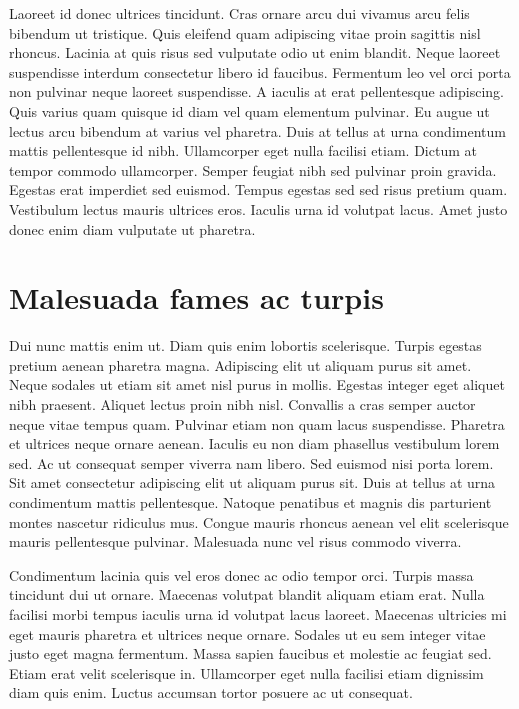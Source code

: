 \documentclass[uplatex, english, twocolumn]{jsarticle}
\begin{document}
Laoreet id donec ultrices tincidunt. Cras ornare arcu dui vivamus arcu felis bibendum ut tristique. Quis eleifend quam adipiscing vitae proin sagittis nisl rhoncus. Lacinia at quis risus sed vulputate odio ut enim blandit. Neque laoreet suspendisse interdum consectetur libero id faucibus. Fermentum leo vel orci porta non pulvinar neque laoreet suspendisse. A iaculis at erat pellentesque adipiscing. Quis varius quam quisque id diam vel quam elementum pulvinar. Eu augue ut lectus arcu bibendum at varius vel pharetra. Duis at tellus at urna condimentum mattis pellentesque id nibh. Ullamcorper eget nulla facilisi etiam. Dictum at tempor commodo ullamcorper. Semper feugiat nibh sed pulvinar proin gravida. Egestas erat imperdiet sed euismod. Tempus egestas sed sed risus pretium quam. Vestibulum lectus mauris ultrices eros. Iaculis urna id volutpat lacus. Amet justo donec enim diam vulputate ut pharetra.

\section{Malesuada fames ac turpis}

Dui nunc mattis enim ut. Diam quis enim lobortis scelerisque. Turpis egestas pretium aenean pharetra magna. Adipiscing elit ut aliquam purus sit amet. Neque sodales ut etiam sit amet nisl purus in mollis. Egestas integer eget aliquet nibh praesent. Aliquet lectus proin nibh nisl. Convallis a cras semper auctor neque vitae tempus quam. Pulvinar etiam non quam lacus suspendisse. Pharetra et ultrices neque ornare aenean. Iaculis eu non diam phasellus vestibulum lorem sed. Ac ut consequat semper viverra nam libero. Sed euismod nisi porta lorem. Sit amet consectetur adipiscing elit ut aliquam purus sit. Duis at tellus at urna condimentum mattis pellentesque. Natoque penatibus et magnis dis parturient montes nascetur ridiculus mus. Congue mauris rhoncus aenean vel elit scelerisque mauris pellentesque pulvinar. Malesuada nunc vel risus commodo viverra.

Condimentum lacinia quis vel eros donec ac odio tempor orci. Turpis massa tincidunt dui ut ornare. Maecenas volutpat blandit aliquam etiam erat. Nulla facilisi morbi tempus iaculis urna id volutpat lacus laoreet. Maecenas ultricies mi eget mauris pharetra et ultrices neque ornare. Sodales ut eu sem integer vitae justo eget magna fermentum. Massa sapien faucibus et molestie ac feugiat sed. Etiam erat velit scelerisque in. Ullamcorper eget nulla facilisi etiam dignissim diam quis enim. Luctus accumsan tortor posuere ac ut consequat.
\end{document}
